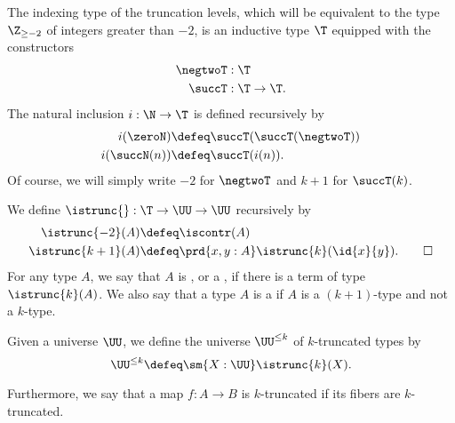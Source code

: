 The indexing type of the truncation levels, which will be equivalent to the type $\Z_{\geq -2}$ of integers greater than $-2$, is an inductive type $\T$ equipped with the constructors
\begin{align*}
  \negtwoT & : \T \\
  \succT & : \T\to\T.
\end{align*}
The natural inclusion $i:\N\to \T$ is defined recursively by
\begin{align*}
  i(\zeroN) & \defeq \succT(\succT(\negtwoT)) \\
  i(\succN(n)) & \defeq \succT(i(n)).
\end{align*}
Of course, we will simply write $-2$ for $\negtwoT$ and $k+1$ for $\succT(k)$.

\begin{defn}
We define $\istrunc{} : \T\to\UU\to\UU$ recursively by
\begin{align*}
\istrunc{-2}(A) & \defeq \iscontr(A) \\
\istrunc{k+1}(A) & \defeq \prd{x,y:A}\istrunc{k}(\id{x}{y}).\qedhere
\end{align*}
For any type $A$, we say that $A$ is , or a , if there is a term of type $\istrunc{k}(A)$. We also say that a type $A$ is a  if $A$ is a $(k+1)$-type and not a $k$-type.

Given a universe $\UU$, we define the universe $\UU^{\leq k}$ of $k$-truncated types by
\begin{equation*}
  \UU^{\leq k}\defeq\sm{X:\UU}\istrunc{k}(X).
\end{equation*}

Furthermore, we say that a map $f:A\to B$ is $k$-truncated if its fibers are $k$-truncated.
\end{defn}

